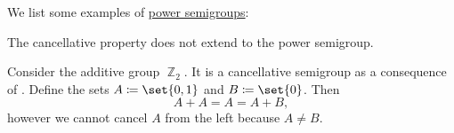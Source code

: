 \begin{example}\label{ex:def:power_semigroup}
  We list some examples of \hyperref[def:power_semigroup]{power semigroups}:
  \begin{thmenum}
     The cancellative property does not extend to the power semigroup.

    Consider the additive group \hyperref[def:group_of_integers_modulo]{\( \BbbZ_2 \)}. It is a cancellative semigroup as a consequence of . Define the sets \( A \coloneqq \set{ 0, 1 } \) and \( B \coloneqq \set{ 0 } \). Then
    \begin{equation*}
      A + A = A = A + B,
    \end{equation*}
    however we cannot cancel \( A \) from the left because \( A \neq B \).
  \end{thmenum}
\end{example}

